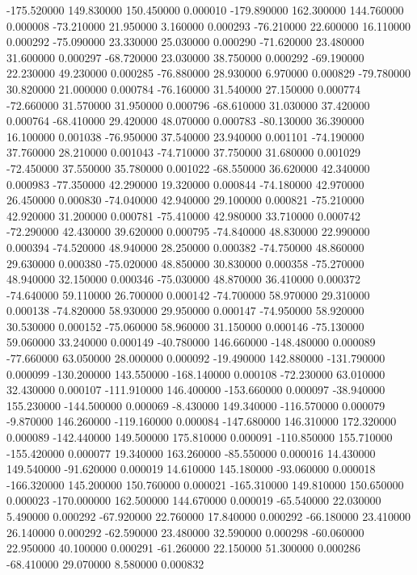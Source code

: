 -175.520000 149.830000 150.450000 0.000010 
-179.890000 162.300000 144.760000 0.000008 
-73.210000 21.950000 3.160000 0.000293 
-76.210000 22.600000 16.110000 0.000292 
-75.090000 23.330000 25.030000 0.000290 
-71.620000 23.480000 31.600000 0.000297 
-68.720000 23.030000 38.750000 0.000292 
-69.190000 22.230000 49.230000 0.000285 
-76.880000 28.930000 6.970000 0.000829 
-79.780000 30.820000 21.000000 0.000784 
-76.160000 31.540000 27.150000 0.000774 
-72.660000 31.570000 31.950000 0.000796 
-68.610000 31.030000 37.420000 0.000764 
-68.410000 29.420000 48.070000 0.000783 
-80.130000 36.390000 16.100000 0.001038 
-76.950000 37.540000 23.940000 0.001101 
-74.190000 37.760000 28.210000 0.001043 
-74.710000 37.750000 31.680000 0.001029 
-72.450000 37.550000 35.780000 0.001022 
-68.550000 36.620000 42.340000 0.000983 
-77.350000 42.290000 19.320000 0.000844 
-74.180000 42.970000 26.450000 0.000830 
-74.040000 42.940000 29.100000 0.000821 
-75.210000 42.920000 31.200000 0.000781 
-75.410000 42.980000 33.710000 0.000742 
-72.290000 42.430000 39.620000 0.000795 
-74.840000 48.830000 22.990000 0.000394 
-74.520000 48.940000 28.250000 0.000382 
-74.750000 48.860000 29.630000 0.000380 
-75.020000 48.850000 30.830000 0.000358 
-75.270000 48.940000 32.150000 0.000346 
-75.030000 48.870000 36.410000 0.000372 
-74.640000 59.110000 26.700000 0.000142 
-74.700000 58.970000 29.310000 0.000138 
-74.820000 58.930000 29.950000 0.000147 
-74.950000 58.920000 30.530000 0.000152 
-75.060000 58.960000 31.150000 0.000146 
-75.130000 59.060000 33.240000 0.000149 
-40.780000 146.660000 -148.480000 0.000089 
-77.660000 63.050000 28.000000 0.000092 
-19.490000 142.880000 -131.790000 0.000099 
-130.200000 143.550000 -168.140000 0.000108 
-72.230000 63.010000 32.430000 0.000107 
-111.910000 146.400000 -153.660000 0.000097 
-38.940000 155.230000 -144.500000 0.000069 
-8.430000 149.340000 -116.570000 0.000079 
-9.870000 146.260000 -119.160000 0.000084 
-147.680000 146.310000 172.320000 0.000089 
-142.440000 149.500000 175.810000 0.000091 
-110.850000 155.710000 -155.420000 0.000077 
19.340000 163.260000 -85.550000 0.000016 
14.430000 149.540000 -91.620000 0.000019 
14.610000 145.180000 -93.060000 0.000018 
-166.320000 145.200000 150.760000 0.000021 
-165.310000 149.810000 150.650000 0.000023 
-170.000000 162.500000 144.670000 0.000019 
-65.540000 22.030000 5.490000 0.000292 
-67.920000 22.760000 17.840000 0.000292 
-66.180000 23.410000 26.140000 0.000292 
-62.590000 23.480000 32.590000 0.000298 
-60.060000 22.950000 40.100000 0.000291 
-61.260000 22.150000 51.300000 0.000286 
-68.410000 29.070000 8.580000 0.000832 
